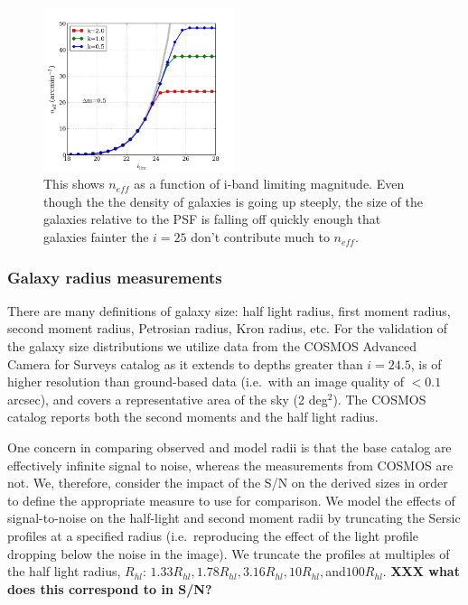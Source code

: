 \documentclass[]{article}
\begin{document}
\begin{figure}[H]
\centering
\includegraphics[width=0.5\textwidth]{validation_figures/neff_m_ir.png}
\caption{This shows $n_{eff}$ as a function of i-band limiting magnitude.  Even though the the density of galaxies is going up steeply, the 
size of the galaxies relative to the PSF is falling off quickly enough that galaxies fainter the $i=25$ don't contribute much to $n_{eff}$.\label{fig:neffvm}}
\end{figure}


\subsubsection{Galaxy radius measurements}
There are many definitions of galaxy size: half light radius, first
moment radius, second moment radius, Petrosian radius, Kron radius,
etc.  For the validation of the galaxy size distributions we utilize
data from the COSMOS Advanced Camera for Surveys catalog \citep{cosmos} as it
extends to depths greater than $i=24.5$, is of higher resolution than
ground-based data (i.e.\ with an image quality of $<0.1$ arcsec), and
covers a representative area of the sky (2 deg$^2$). The COSMOS catalog reports both the second moments and the 
half light radius. 

One concern in comparing observed and model radii is that the base
catalog are effectively infinite signal to noise, whereas the
measurements from COSMOS are not.  We, therefore, consider the impact
of the S/N on the derived sizes in order to define the appropriate
measure to use for comparison. We model the effects of signal-to-noise
on the half-light and second moment radii by truncating the Sersic
profiles at a specified radius (i.e.\ reproducing the effect of the
light profile dropping below the noise in the image).  We truncate the
profiles at multiples of the half light radius, $R_{hl}$: $1.33R_{hl},
1.78R_{hl}, 3.16R_{hl}, 10R_{hl}, $and$100R_{hl}$. {\bf XXX what does
  this correspond to in S/N?}
\end{document}
